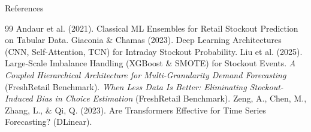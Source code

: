 \documentclass[10pt, aspectratio=169]{beamer}
\begin{document}
\begin{frame}{References}
  \small
  \begin{thebibliography}{99}
     Andaur et al. (2021). Classical ML Ensembles for Retail Stockout Prediction on Tabular Data.
     Giaconia \& Chamas (2023). Deep Learning Architectures (CNN, Self-Attention, TCN) for Intraday Stockout Probability.
     Liu et al. (2025). Large-Scale Imbalance Handling (XGBoost \& SMOTE) for Stockout Events.
     \textit{A Coupled Hierarchical Architecture for Multi-Granularity Demand Forecasting} (FreshRetail Benchmark).
     \textit{When Less Data Is Better: Eliminating Stockout-Induced Bias in Choice Estimation} (FreshRetail Benchmark).
     Zeng, A., Chen, M., Zhang, L., \& Qi, Q. (2023). Are Transformers Effective for Time Series Forecasting? (DLinear).
  \end{thebibliography}
\end{frame}
\end{document}
